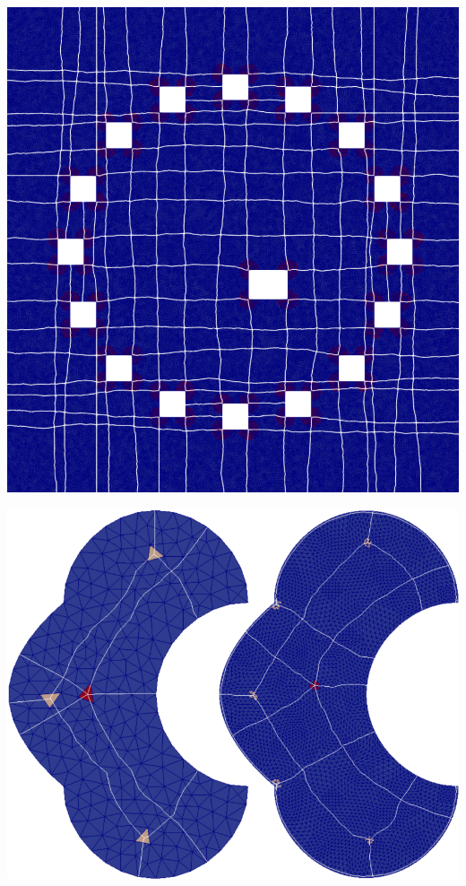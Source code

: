 \documentclass[a0paper,portrait, fontscale=0.30]{baposter}
\begin{document}
\begin{poster}
{\begin{minipage}[b]{0.25\linewidth}
\includegraphics[width=\textwidth]{Tomo}
\end{minipage}
\begin{minipage}[b]{0.35\linewidth}
  \includegraphics[width=\textwidth]{flower_img}

\end{minipage}}
\end{poster}
\end{document}
